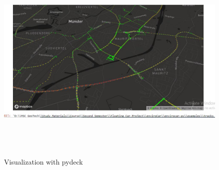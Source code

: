 \documentclass[11pt]{article}
\makeatletter
\newcommand{\boxspacing}{\kern\kvtcb@left@rule\kern\kvtcb@boxsep}
\newcommand{\prompt}[4]{
        \ttfamily\llap{{\color{#2}[#3]:\hspace{3pt}#4}}\vspace{-\baselineskip}
    }
\makeatother
\begin{document}
    \begin{tcolorbox}[breakable, size=fbox, boxrule=1pt, pad at break*=1mm,colback=cellbackground, colframe=cellborder]
\prompt{In}{incolor}{ }{\boxspacing}
\begin{figure}[H]
	\centering
	\includegraphics[width=1\linewidth,height=10cm]{pydeck.jpg} 
	\caption{Visualization with pydeck}
	\label{fig:workflow}
\end{figure}
\begin{Verbatim}[commandchars=\\\{\}]

\end{Verbatim}
\end{tcolorbox}


    
    
    
\end{document}

